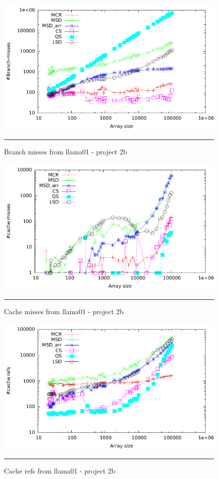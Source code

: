 \begin{figure}[ht]
	\centering
		\includegraphics[width=\textwidth]{./Appendices/Figures/Project2b/Branch_misses.pdf}
		\rule{35em}{0.5pt}
	\caption[Branch misses]{
	Branch misses from llama01 - project 2b
	}
	\label{fig:Branch_misses_p2bputty}
\end{figure}
\begin{figure}[ht]
	\centering
		\includegraphics[width=\textwidth]{./Appendices/Figures/Project2b/Cache_misses.pdf}
		\rule{35em}{0.5pt}
	\caption[Cache misses]{
	Cache misses from llama01 - project 2b
	}
	\label{fig:Cache_misses_p2b_putty}
\end{figure}
\begin{figure}[ht]
	\centering
		\includegraphics[width=\textwidth]{./Appendices/Figures/Project2b/Cache_refs.pdf}
		\rule{35em}{0.5pt}
	\caption[Cache refs]{
	Cache refs from llama01 - project 2b
	}
	\label{fig:Cache_refs_p2b_putty}
\end{figure}
